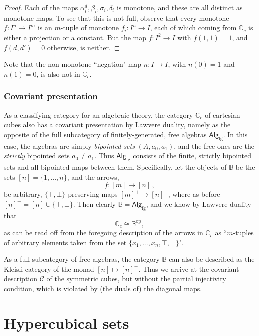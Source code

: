 \documentclass[11pt]{article}
\newcommand{\C}{\ensuremath{\mathbb{C}}}
\newcommand{\B}{\ensuremath{\mathbb{B}}}
\newcommand{\CC}{\ensuremath{\mathcal{C}}}
\theoremstyle{remark}
\theoremstyle{definition}
\begin{document}
\begin{proof}
Each of the maps $\alpha^d_i, \beta_i, \sigma_i, \delta_i$ is monotone, and these are all distinct as monotone maps.
To see that this is not full, observe that every monotone $f : I^n \to I^m$ is an $m$-tuple of monotone $f_i : I^n \to I$, each of which coming from $\C_c$ is either a projection or a constant.  But the map $f : I^2 \to I$ with $f(1,1) = 1$, and $f(d,d') = 0$ otherwise, is neither.
\end{proof}
%
Note that the non-monotone ``negation" map $n : I \to I$, with $n(0) = 1$ and $n(1) = 0$, is also not in $\C_c$.


\subsubsection{Covariant presentation}\label{subsubsec:covariant}

As a classifying category for an algebraic theory, the category $\C_c$ of cartesian cubes also has a covariant presentation by Lawvere duality, namely as the opposite of the full subcategory of finitely-generated, free algebras $\mathsf{Alg}_{\mathrm{fg}}$.  In this case, the algebras are simply \emph{bipointed sets} $(A, a_0, a_1)$, and the free ones are the \emph{strictly} bipointed sets $a_0\neq a_1$.  Thus $\mathsf{Alg}_{\mathrm{fg}}$ consists of the finite, strictly bipointed sets and all bipointed maps between them.  Specifically, let the objects of $\mathbb{B}$ be the sets $[n] = \{1, ..., n\}$, and the arrows,
\[
f : [m] \to [n]\,,
\]
be arbitrary, $\{\top, \bot\}$-preserving maps $[m]^+ \to [n]^+$, where as before $[n]^+ = [n]\cup\{\top, \bot\}$.  Then clearly $\B = \mathsf{Alg}_{\mathrm{fg}}$, and we know by Lawvere duality that $$\C_c \cong \B^{\mathrm{op}},$$ as can be read off from the foregoing description of the arrows in $\C_c$ as ``$m$-tuples of arbitrary elements taken from the set $\{x_1, ..., x_n, \top, \bot\}$".

As a full subcategory of free algebras, the category $\B$ can also be described as the Kleisli category of the monad $[n] \mapsto [n]^+$.   Thus we arrive at the covariant description $\CC$ of the symmetric cubes, but without the partial injectivity condition, which is violated by (the duals of) the diagonal maps.

\section{Hypercubical sets}
\end{document}
